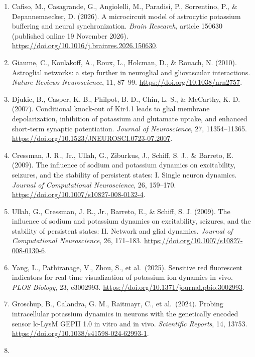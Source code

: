 \documentclass[
  11pt,
]{article}
\begin{document}
\begin{enumerate}
  compartmental systems. \emph{SIAM Review}, 35, 43--79.
  \url{https://doi.org/10.1137/1035003}.
\item
  Cafiso, M., Casagrande, G., Angiolelli, M., Paradisi, P., Sorrentino,
  P., \& Depannemaecker, D. (2026). A microcircuit model of astrocytic
  potassium buffering and neural synchronization. \emph{Brain Research},
  article 150630 (published online 19 November 2026).
  \url{https://doi.org/10.1016/j.brainres.2026.150630}.
\item
  Giaume, C., Koulakoff, A., Roux, L., Holcman, D., \& Rouach, N.
  (2010). Astroglial networks: a step further in neuroglial and
  gliovascular interactions. \emph{Nature Reviews Neuroscience}, 11,
  87--99. \url{https://doi.org/10.1038/nrn2757}.
\item
  Djukic, B., Casper, K. B., Philpot, B. D., Chin, L.-S., \& McCarthy,
  K. D. (2007). Conditional knock-out of Kir4.1 leads to glial membrane
  depolarization, inhibition of potassium and glutamate uptake, and
  enhanced short-term synaptic potentiation. \emph{Journal of
  Neuroscience}, 27, 11354--11365.
  \url{https://doi.org/10.1523/JNEUROSCI.0723-07.2007}.
\item
  Cressman, J. R., Jr., Ullah, G., Ziburkus, J., Schiff, S. J., \&
  Barreto, E. (2009). The influence of sodium and potassium dynamics on
  excitability, seizures, and the stability of persistent states: I.
  Single neuron dynamics. \emph{Journal of Computational Neuroscience},
  26, 159--170. \url{https://doi.org/10.1007/s10827-008-0132-4}.
\item
  Ullah, G., Cressman, J. R., Jr., Barreto, E., \& Schiff, S. J. (2009).
  The influence of sodium and potassium dynamics on excitability,
  seizures, and the stability of persistent states: II. Network and
  glial dynamics. \emph{Journal of Computational Neuroscience}, 26,
  171--183. \url{https://doi.org/10.1007/s10827-008-0130-6}.
\item
  Yang, L., Pathiranage, V., Zhou, S., et al.~(2025). Sensitive red
  fluorescent indicators for real-time visualization of potassium ion
  dynamics in vivo. \emph{PLOS Biology}, 23, e3002993.
  \url{https://doi.org/10.1371/journal.pbio.3002993}.
\item
  Groschup, B., Calandra, G. M., Raitmayr, C., et al.~(2024). Probing
  intracellular potassium dynamics in neurons with the genetically
  encoded sensor lc-LysM GEPII 1.0 in vitro and in vivo.
  \emph{Scientific Reports}, 14, 13753.
  \url{https://doi.org/10.1038/s41598-024-62993-1}.
\item

\end{enumerate}
\end{document}
